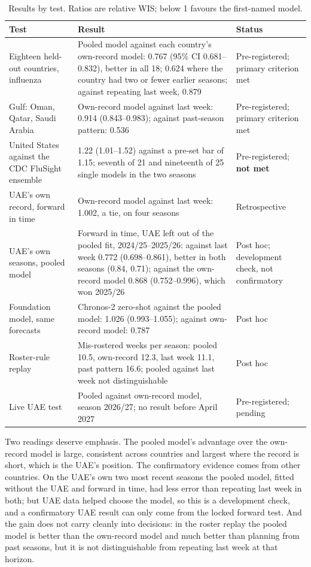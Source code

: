 \documentclass[11pt,a4paper]{article}
\begin{document}
\begin{table}[h]
\centering
\small
\begin{tabularx}{\textwidth}{@{}>{\raggedright\arraybackslash}p{3.6cm}Y>{\raggedright\arraybackslash}p{2.7cm}@{}}
\toprule
Test & Result & Status \\
\midrule
Eighteen held-out countries, influenza & Pooled model against each country's own-record model: 0.767 (95\% CI 0.681--0.832), better in all 18; 0.624 where the country had two or fewer earlier seasons; against repeating last week, 0.879 & Pre-registered; primary criterion met \\
Gulf: Oman, Qatar, Saudi Arabia & Own-record model against last week: 0.914 (0.843--0.983); against past-season pattern: 0.536 & Pre-registered; primary criterion met \\
United States against the CDC FluSight ensemble & 1.22 (1.01--1.52) against a pre-set bar of 1.15; seventh of 21 and nineteenth of 25 single models in the two seasons & Pre-registered; \textbf{not met} \\
UAE's own record, forward in time & Own-record model against last week: 1.002, a tie, on four seasons & Retrospective \\
UAE's own seasons, pooled model & Forward in time, UAE left out of the pooled fit, 2024/25--2025/26: against last week 0.772 (0.698--0.861), better in both seasons (0.84, 0.71); against the own-record model 0.868 (0.752--0.996), which won 2025/26 & Post hoc; development check, not confirmatory \\
Foundation model, same forecasts & Chronos-2 zero-shot against the pooled model: 1.026 (0.993--1.055); against own-record model: 0.787 & Post hoc \\
Roster-rule replay & Mis-rostered weeks per season: pooled 10.5, own-record 12.3, last week 11.1, past pattern 16.6; pooled against last week not distinguishable & Post hoc \\
Live UAE test & Pooled against own-record model, season 2026/27; no result before April 2027 & Pre-registered; pending \\
\bottomrule
\end{tabularx}
\caption{Results by test. Ratios are relative WIS; below 1 favours the first-named model.}
\label{tab:results}
\end{table}

Two readings deserve emphasis. The pooled model's advantage over the own-record model is large, consistent across countries and largest where the record is short, which is the UAE's position. The confirmatory evidence comes from other countries. On the UAE's own two most recent seasons the pooled model, fitted without the UAE and forward in time, had less error than repeating last week in both; but UAE data helped choose the model, so this is a development check, and a confirmatory UAE result can only come from the locked forward test. And the gain does not carry cleanly into decisions: in the roster replay the pooled model is better than the own-record model and much better than planning from past seasons, but it is not distinguishable from repeating last week at that horizon.
\end{document}
